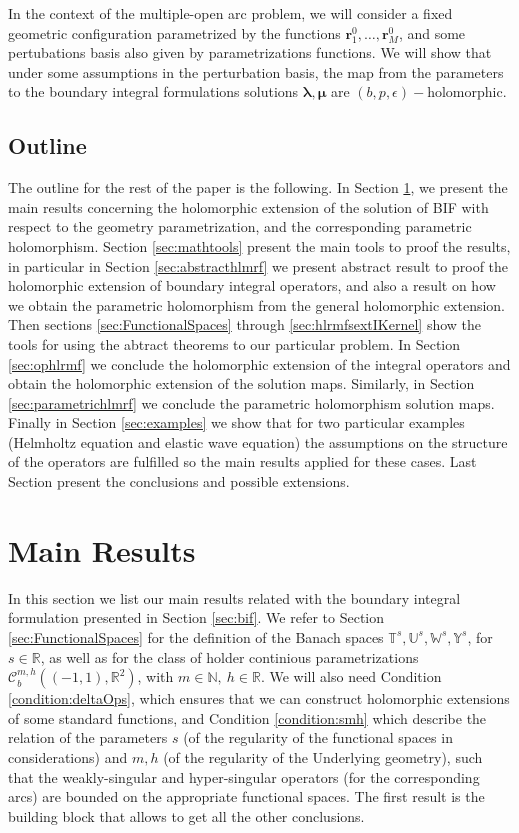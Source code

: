 \documentclass{article}
\newcommand{\bmu} {\bm{\mu}}
\newcommand{\IN}{{\mathbb N}}
\newcommand{\IR}{{\mathbb R}}
\newcommand{\IU}{{\mathbb U}}
\newcommand{\IT}{{\mathbb T}}
\newcommand{\IW}{{\mathbb W}}
\newcommand{\IY}{{\mathbb Y}}
\newcommand{\rgeoh}[2]{\mathcal{C}_b^{#1,#2}\left( (-1,1), \IR^2 \right)}
\newcommand{\bla}{\boldsymbol \lambda}
\newcommand{\br}{\bm{r}}
\begin{document}
In the context of the multiple-open arc problem, we will consider a fixed geometric configuration parametrized by the functions $\br_1^0 ,\hdots, \br_M^0$, and some pertubations basis also given by parametrizations functions. We will show that under some assumptions in the perturbation basis, the map from the parameters to the boundary integral formulations solutions $\bla,\bmu$ are $(b,p,\epsilon)-$holomorphic.
\subsection{Outline}
The outline for the rest of the paper is the following. In Section \ref{sec:MainResult}, we present the main results concerning the holomorphic extension of the solution of BIF with respect to the geometry parametrization, and the corresponding parametric holomorphism. Section \ref{sec:mathtools} present the main tools to proof the results, in particular in Section \ref{sec:abstracthlmrf}  we present abstract result to proof the holomorphic extension of boundary integral operators, and also a result on how we obtain the parametric holomorphism from the general holomorphic extension. Then sections \ref{sec:FunctionalSpaces} through \ref{sec:hlrmfsextIKernel} show the tools for using the abtract theorems to our particular problem. 
In Section \ref{sec:ophlrmf} we conclude the holomorphic extension of the integral operators and obtain the holomorphic extension of the solution maps. Similarly, in Section \ref{sec:parametrichlmrf} we conclude the parametric holomorphism  solution maps. 
Finally in Section \ref{sec:examples} we show that for two particular examples (Helmholtz equation and elastic wave equation) the assumptions on the structure of the operators are fulfilled so the main results applied for these cases. Last Section present the conclusions and possible extensions. 
\section{Main Results}
\label{sec:MainResult}
In this section we list our main results related with the boundary integral formulation presented in Section \ref{sec:bif}. We refer to Section \ref{sec:FunctionalSpaces} for the definition of the Banach spaces $\IT^s,\IU^s,\IW^s,\IY^s$, for $s \in \IR$, as well as for the class of holder continious parametrizations $\rgeoh{m}{h}$, with $m \in \IN, \ h\in \IR$. We will also need Condition \ref{condition:deltaOps}, which ensures that we can construct holomorphic extensions of some standard functions, and Condition \ref{condition:smh} which describe the relation of the parameters $s$ (of the regularity of the functional spaces in considerations) and $m,h$ (of the regularity of the Underlying geometry), such that the weakly-singular and hyper-singular operators (for the corresponding arcs) are bounded on the appropriate functional spaces. The first result is the building block that allows to get all the other conclusions.
\end{document}
